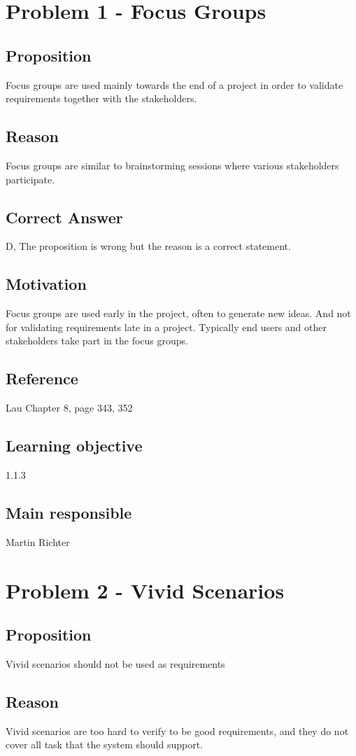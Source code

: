 \documentclass[a4paper]{article}
\begin{document}
\section{Problem 1 - Focus Groups}
\subsection{Proposition}
Focus groups are used mainly towards the end of a project in order to validate requirements together with the stakeholders.
\subsection{Reason}
Focus groups are similar to brainstorming sessions where various stakeholders participate.
\subsection{Correct Answer}
D, The proposition is wrong but the reason is a correct statement.
\subsection{Motivation}
Focus groups are used early in the project, often to generate new ideas. And not for validating requirements late in a project. Typically end users and other stakeholders take part in the focus groups.
\subsection{Reference}
Lau Chapter 8, page 343, 352
\subsection{Learning objective}
1.1.3
\subsection{Main responsible}
Martin Richter

\section{Problem 2 - Vivid Scenarios}
\subsection{Proposition}
Vivid scenarios should not be used as requirements
\subsection{Reason}
Vivid scenarios are too hard to verify to be good requirements, and they do not cover all task that the system should support.
\end{document}
